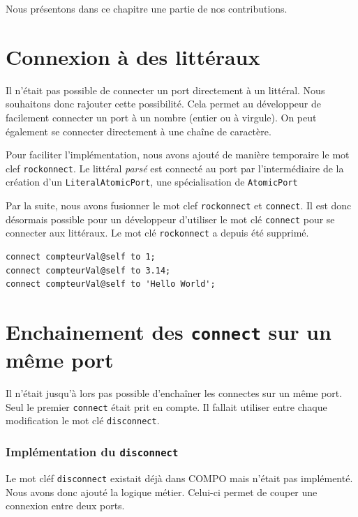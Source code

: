 \documentclass[11pt,a4paper,openany,oneside]{book}
\begin{document}
Nous présentons dans ce chapitre une partie de nos contributions.

\section{Connexion à des littéraux}

Il n'était pas possible de connecter un port directement à un littéral. Nous souhaitons donc rajouter cette possibilité. Cela permet au développeur de facilement connecter un port à un nombre (entier ou à virgule). On peut également se connecter directement à une chaîne de caractère. 

Pour faciliter l'implémentation, nous avons ajouté de manière temporaire le mot clef \texttt{rockonnect}. Le littéral \textit{parsé} est connecté au port par l'intermédiaire de la création d'un \texttt{LiteralAtomicPort}, une spécialisation de \texttt{AtomicPort}

Par la suite, nous avons fusionner le mot clef \texttt{rockonnect} et \texttt{connect}. Il est donc désormais possible pour un développeur d'utiliser le mot clé \texttt{connect} pour se connecter aux littéraux. Le mot clé \texttt{rockonnect} a depuis été supprimé.

\begin{lstlisting}[language=Compo, frame=single, caption=Syntaxe d'une connexion à un littéral]
connect compteurVal@self to 1;
connect compteurVal@self to 3.14;
connect compteurVal@self to 'Hello World';
\end{lstlisting}


\section{Enchainement des \texttt{connect} sur un même port}

Il n'était jusqu'à lors pas possible d'enchaîner les connectes sur un même port. Seul le premier \texttt{connect} était prit en compte. Il fallait utiliser entre chaque modification le mot clé \texttt{disconnect}.


\subsubsection{Implémentation du \texttt{disconnect}}

Le mot cléf \texttt{disconnect} existait déjà dans COMPO mais n'était pas implémenté. Nous avons donc ajouté la logique métier. Celui-ci permet de couper une connexion entre deux ports.
\end{document}
